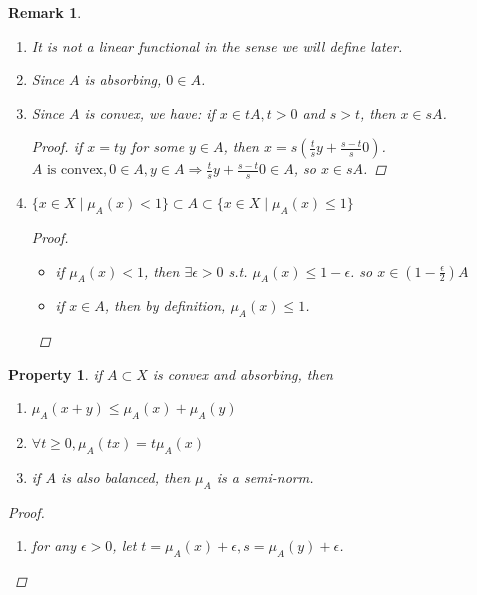 \documentclass{article}
\newtheorem*{remark}{Remark}
\newtheorem*{property}{Property}
\begin{document}
\begin{remark} \hfill
    \begin{enumerate}
        \item It is not a linear functional in the sense we will define later.
        \item Since $A$ is absorbing, $0 \in A$.
        \item Since $A$ is convex, we have: if $x \in tA, t > 0$ and $s>t$, then $x \in sA$.
        \begin{proof}
            if $x = ty$ for some $y \in A$, then $x=s(\frac{t}{s}y + \frac{s-t}{s}0)$. \(A \mbox{ is convex},
            0 \in A, y \in A \Rightarrow \frac{t}{s}y + \frac{s-t}{s}0 \in A\), so $x \in sA$.
        \end{proof}
        \item \(\{x \in X \mid \mu_{A}(x) < 1\} \subset A \subset \{x \in X \mid \mu_{A}(x) \le 1\}\)
        \begin{proof} \hfil
            \begin{itemize}
                \item if $\mu_A(x) < 1$, then $\exists \epsilon > 0$ s.t. $\mu_A(x) \le 1 - \epsilon$. so $x \in (1 - \frac{\epsilon}{2})A$
                \item if $x \in A$, then by definition, $\mu_A(x) \le 1$.
            \end{itemize}
        \end{proof}
    \end{enumerate}    
\end{remark}
\begin{property} if $A \subset X$ is convex and absorbing, then
    \begin{enumerate}
        \item $\mu_A(x + y) \le \mu_A(x) + \mu_A(y)$
        \item $\forall t \ge 0, \mu_A(tx) = t\mu_A(x)$
        \item if $A$ is also balanced, then $\mu_A$ is a semi-norm.
    \end{enumerate}
    \begin{proof} \hfill
       \begin{enumerate}
        \item for any $\epsilon > 0$, let $t=\mu_A(x) + \epsilon, s=\mu_A(y) + \epsilon$.
       \end{enumerate} 
    \end{proof}
\end{property}
\end{document}
